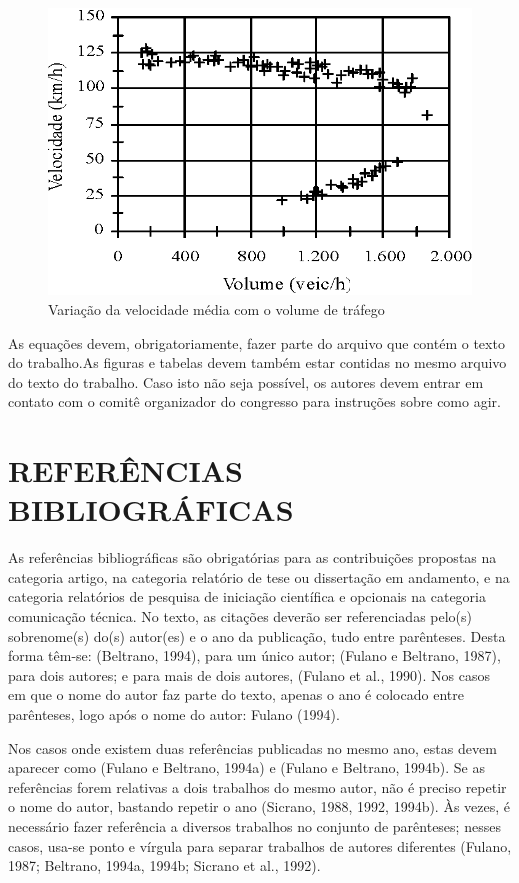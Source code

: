 \documentclass{anpet}
\begin{document}
\begin{figure}[H]
  \begin{center}
    \includegraphics{Figuras/Figura_2.eps}
    \caption{Variação da velocidade média com o volume de tráfego}
    \label{fig:graf_vel_vol}
  \end{center}
\end{figure}

As equações devem, obrigatoriamente, fazer parte do arquivo que contém o texto do trabalho.As figuras e tabelas devem também estar contidas no mesmo arquivo do texto do trabalho. Caso isto não seja possível, os autores devem entrar em contato com o comitê organizador do congresso para instruções sobre como agir.

\section{REFERÊNCIAS BIBLIOGRÁFICAS}

As referências bibliográficas são obrigatórias para as contribuições propostas na categoria artigo, na categoria relatório de tese ou dissertação em andamento, e na categoria relatórios de pesquisa de iniciação científica e opcionais na categoria comunicação técnica. No texto, as citações deverão ser referenciadas pelo(s) sobrenome(s) do(s) autor(es) e o ano da publicação, tudo entre parênteses. Desta forma têm-se: (Beltrano, 1994), para um único autor; (Fulano e Beltrano, 1987), para dois autores; e para mais de dois autores, (Fulano et al., 1990). Nos casos em que o nome do autor faz parte do texto, apenas o ano é colocado entre parênteses, logo após o nome do autor: Fulano (1994).

Nos casos onde existem duas referências publicadas no mesmo ano, estas devem aparecer como (Fulano e Beltrano, 1994a) e (Fulano e Beltrano, 1994b). Se as referências forem relativas a dois trabalhos do mesmo autor, não é preciso repetir o nome do autor, bastando repetir o ano (Sicrano, 1988, 1992, 1994b). Às vezes, é necessário fazer referência a diversos trabalhos no conjunto de parênteses; nesses casos, usa-se ponto e vírgula para separar trabalhos de autores diferentes (Fulano, 1987; Beltrano, 1994a, 1994b; Sicrano et al., 1992).
\end{document}
